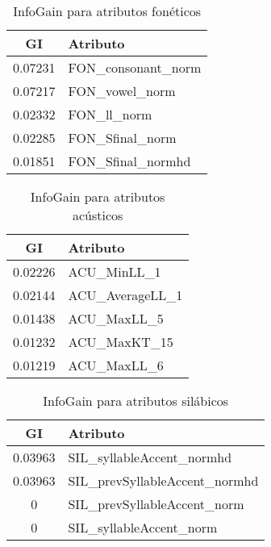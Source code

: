 \begin{minipage}{.5\linewidth}
  	\begin{table}[H]
  	\centering
  	\begin{tabular}{cl}
  		\hline
  		\textbf{GI} & \textbf{Atributo} \\ \hline
		 0.07231 & FON\_consonant\_norm \\
		 0.07217 & FON\_vowel\_norm \\
		 0.02332 & FON\_ll\_norm \\
		 0.02285 & FON\_Sfinal\_norm \\
		 0.01851 & FON\_Sfinal\_normhd \\
  		\hline
  	\end{tabular}
  	\caption{InfoGain para atributos fonéticos}
  	\label{IG_fon}
	\end{table}
\end{minipage}
\begin{minipage}{.5\linewidth}	
  	\begin{table}[H]
  		\centering
  		\begin{tabular}{cl}
  			\hline
  			\textbf{GI} & \textbf{Atributo} \\ \hline
			0.02226 & ACU\_MinLL\_1 \\
			0.02144 & ACU\_AverageLL\_1 \\
			0.01438 & ACU\_MaxLL\_5 \\
			0.01232 & ACU\_MaxKT\_15 \\
			0.01219 & ACU\_MaxLL\_6 \\
  			\hline
  		\end{tabular}
  		\caption{InfoGain para atributos acústicos}
  		\label{IG_acu}
  	\end{table}
\end{minipage}
  	
  	\begin{table}[H]
  		\centering
  		\begin{tabular}{cl}
  			\hline
  			\textbf{GI} & \textbf{Atributo} \\ \hline
  			0.03963 & SIL\_syllableAccent\_normhd \\
  			0.03963 & SIL\_prevSyllableAccent\_normhd \\
  			0       & SIL\_prevSyllableAccent\_norm \\
  			0       & SIL\_syllableAccent\_norm \\
  			\hline
  		\end{tabular}
  		\caption{InfoGain para atributos silábicos} 
  		\label{IG_sil}
  	\end{table}
  	
